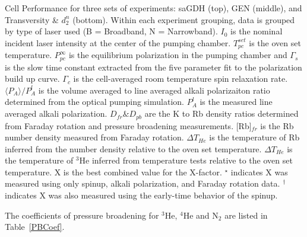 \documentclass[pdftex,letterpaper,12pt]{report}
\begin{document}
\begin{table}
\begin{center}
		{Cell Performance for three sets of experiments: saGDH (top), GEN (middle), and Transversity \& $d_2^n$ (bottom).  Within each experiment grouping, data is grouped by type of laser used (B = Broadband, N = Narrowband). $I_0$ is the nominal incident laser intensity at the center of the pumping chamber. $T_{pc}^{set}$ is the oven set temperature. $P_{pc}^\infty$ is the equilibrium polarization in the pumping chamber and $\Gamma_s$ is the slow time constant extracted from the five parameter fit to the polarization build up curve. $\Gamma_c$ is the cell-averaged room temperature spin relaxation rate. $\langle P_A\rangle/P_A^l$ is the volume averaged to line averaged alkali polarizaiton ratio determined from the optical pumping simulation. $P_A^l$ is the measured line averaged alkali polarization. $D_{fr} \& D_{pb}$ are the K to Rb density ratios determined from Faraday rotation and pressure broadening measurements. [Rb]$_{fr}$ is the Rb number density measured from Faraday rotation. $\Delta T_{He}$ is the temperature of Rb inferred from the number density relative to the oven set temperature. $\Delta T_{He}$ is the temperature of $^3$He inferred from temperature tests relative to the oven set temperature. X is the best combined value for the X-factor. $^\star$ indicates X was measured using only spinup, alkali polarization, and Faraday rotation data. $^\dagger$ indicates X was also measured using the early-time behavior of the spinup.}
	\end{center}
	\label{table:CellTable}
\end{table}

The coefficients of pressure broadening for $^{3}$He, $^{4}$He and N$_{2}$ are listed in Table~\ref{PBCoef}.
\end{document}
